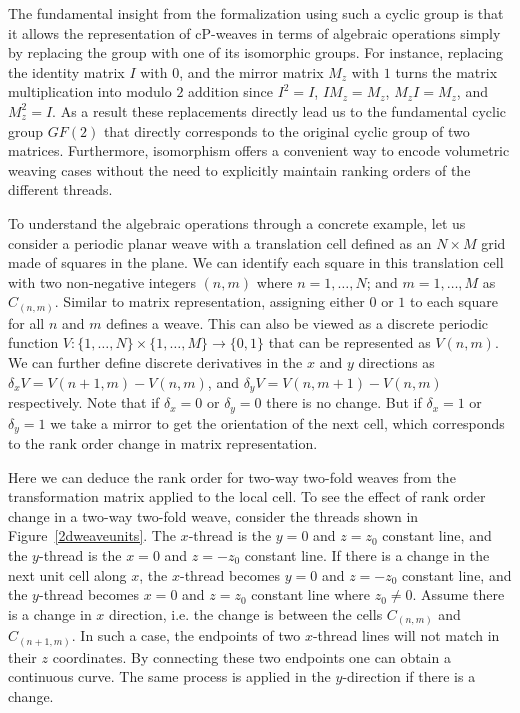 \documentclass[unnumsec,webpdf,contemporary,large]{oup-authoring-template}%
\theoremstyle{thmstyleone}%
\theoremstyle{thmstyletwo}%
\theoremstyle{thmstylethree}%
\begin{document}
{The fundamental insight from the formalization using such a cyclic group is that it allows the representation of cP-weaves in terms of algebraic operations simply by replacing the group with one of its isomorphic groups. For instance, replacing the identity matrix $I$ with $0$, and the mirror matrix $M_z$ with $1$ turns the matrix multiplication into modulo $2$ addition since $I^2 = I$, $I M_z = M_z$, $M_z I = M_z$, and $M^2_z = I$. As a result these replacements directly lead us to the fundamental cyclic group $GF(2)$ that directly corresponds to the original cyclic group of two matrices. Furthermore, isomorphism offers a convenient way to encode volumetric weaving cases without the need to explicitly maintain ranking orders of the different threads.



To understand the algebraic operations through a concrete example, let us consider a periodic planar weave with a translation cell defined as an $N \times M$ grid made of squares in the plane. We can identify each square in this translation cell with two non-negative integers $(n,m)$ where $n=1,\ldots, N$; and $m=1,\ldots, M$ as $C_{(n,m)}$. Similar to matrix representation, assigning either $0$ or $1$ to each square for all $n$ and $m$ defines a weave. This can also be viewed as a discrete periodic function $V: \{1,\ldots,N\} \times \{1,\ldots,M\} \rightarrow \{0,1\}$ that can be represented as $V(n,m)$. We can further define discrete derivatives in the $x$ and $y$ directions as $\delta_x V = V(n+1,m)-V(n,m)$, and $\delta_y V = V(n,m+1)-V(n,m)$ respectively. Note that if $\delta_x=0$ or $\delta_y=0$ there is no change. But if $\delta_x=1$ or $\delta_y=1$ we take a mirror to get the orientation of the next cell, which corresponds to the rank order change in matrix representation. 

Here we can deduce the rank order for two-way two-fold weaves from the transformation matrix applied to the local cell. To see the effect of rank order change in a two-way two-fold weave, consider the threads shown in Figure~\ref{2dweaveunits}. The $x$-thread is the $y=0$ and $z=z_0$ constant line, and the $y$-thread is the $x=0$ and $z=-z_0$ constant line. If there is a change in the next unit cell along $x$, the $x$-thread becomes $y=0$ and $z=-z_0$ constant line, and the $y$-thread becomes $x=0$ and $z=z_0$ constant line where $z_0\neq 0$. Assume there is a change in $x$ direction, i.e. the change is between the cells $C_{(n,m)}$ and $C_{(n+1,m)}$. In such a case, the endpoints of two $x$-thread lines will not match in their $z$ coordinates. By connecting these two endpoints one can obtain a continuous curve. The same process is applied in the $y$-direction if there is a change. 
}
\end{document}
